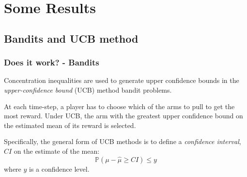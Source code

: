 \documentclass{beamer}
\begin{document}
\section{Some Results}

\subsection{Bandits and UCB method}

\begin{frame}
\frametitle{Does it work? - Bandits}

Concentration inequalities are used to generate upper confidence bounds in the \textit{upper-confidence bound} (UCB) method bandit problems.

At each time-step, a player has to choose which of the arms to pull to get the most reward.
Under UCB, the arm with the greatest upper confidence bound on the estimated mean of its reward is selected.

Specifically, the general form of UCB methods is to define a \textit{confidence interval}, $CI$ on the estimate of the mean:
\[
\mathbb{P}\left(\mu - \hat{\mu} \ge CI \right) \le y
\]
where $y$ is a confidence level.
\end{frame}
\end{document}
